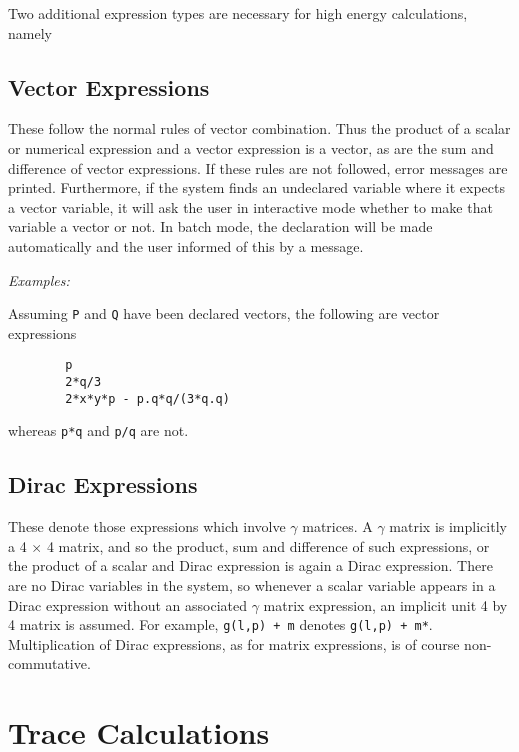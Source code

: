 Two additional expression types are necessary for high energy
calculations, namely

\subsection{Vector Expressions}

These follow the normal rules of vector combination. Thus the product of a
scalar or numerical expression and a vector expression is a vector, as are
the sum and difference of vector expressions. If these rules are not
followed, error messages are printed. Furthermore, if the system finds an
undeclared variable where it expects a vector variable, it will ask the
user in interactive mode whether to make that variable a vector or not. In
batch mode, the declaration will be made automatically and the user
informed of this by a message.

\textit{Examples:}

Assuming \texttt{P} and \texttt{Q} have been declared vectors, the following are
vector expressions
\begin{verbatim}
        p
        2*q/3
        2*x*y*p - p.q*q/(3*q.q)
\end{verbatim}
whereas \texttt{p*q} and \texttt{p/q} are not.

\subsection{Dirac Expressions}

These denote those expressions which involve $\gamma$ matrices. A $\gamma$
matrix is implicitly a 4 $\times$ 4 matrix, and so the product, sum and
difference of such expressions, or the product of a scalar and Dirac
expression is again a Dirac expression.  There are no Dirac variables in
the system, so whenever a scalar variable appears in a Dirac expression
without an associated $\gamma$ matrix expression, an implicit unit 4
by 4 matrix is assumed.  For example, \texttt{g(l,p) + m} denotes 
\texttt{g(l,p) + m*}.  Multiplication of Dirac
expressions, as for matrix expressions, is of course non-commutative.

\section{Trace Calculations}
\hypertarget{command:NOSPUR}{}
\hypertarget{command:SPUR}{}

